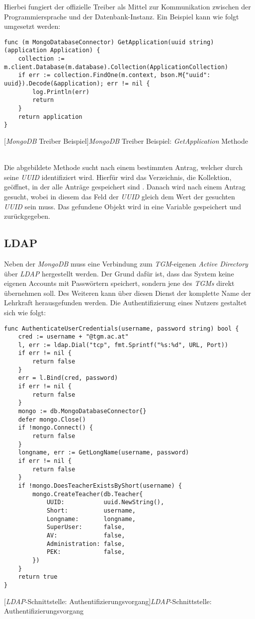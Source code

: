 \newpage

Hierbei fungiert der offizielle Treiber als Mittel zur Kommunikation zwischen der Programmiersprache und der Datenbank-Instanz. Ein Beispiel kann wie folgt umgesetzt werden:

\begin{verbatim}
func (m MongoDatabaseConnector) GetApplication(uuid string) (application Application) {
	collection := m.client.Database(m.database).Collection(ApplicationCollection)
	if err := collection.FindOne(m.context, bson.M{"uuid": uuid}).Decode(&application); err != nil {
		log.Println(err)
		return
	}
	return application
}
\end{verbatim}
[\textit{MongoDB} Treiber Beispiel]{\textit{MongoDB} Treiber Beispiel: \textit{GetApplication} Methode}

~\\

Die abgebildete Methode sucht nach einem bestimmten Antrag, welcher durch seine \textit{UUID} identifiziert wird. Hierfür wird das Verzeichnis, die Kollektion, geöffnet, in der alle Anträge gespeichert sind \cite{mongogo}. Danach wird nach einem Antrag gesucht, wobei in diesem das Feld der \textit{UUID} gleich dem Wert der gesuchten \textit{UUID} sein muss. Das gefundene Objekt wird in eine Variable gespeichert und zurückgegeben.

\newpage

\subsection{LDAP}

Neben der \textit{MongoDB} muss eine Verbindung zum \textit{TGM}-eigenen \textit{Active Directory} über \textit{LDAP} hergestellt werden. Der Grund dafür  ist, dass das System keine eigenen Accounts mit Passwörtern speichert, sondern jene des \textit{TGMs} direkt übernehmen soll. Des Weiteren kann über diesen Dienst der komplette Name der Lehrkraft herausgefunden werden. Die Authentifizierung eines Nutzers gestaltet sich wie folgt:

\begin{verbatim}
func AuthenticateUserCredentials(username, password string) bool {
	cred := username + "@tgm.ac.at"
	l, err := ldap.Dial("tcp", fmt.Sprintf("%s:%d", URL, Port))
	if err != nil {
		return false
	}
	err = l.Bind(cred, password)
	if err != nil {
		return false
	}
	mongo := db.MongoDatabaseConnector{}
	defer mongo.Close()
	if !mongo.Connect() {
		return false
	}
	longname, err := GetLongName(username, password)
	if err != nil {
		return false
	}
	if !mongo.DoesTeacherExistsByShort(username) {
		mongo.CreateTeacher(db.Teacher{
			UUID:           uuid.NewString(),
			Short:          username,
			Longname:       longname,
			SuperUser:      false,
			AV:             false,
			Administration: false,
			PEK:            false,
		})
	}
	return true
}
\end{verbatim}
[\textit{LDAP}-Schnittstelle: Authentifizierungsvorgang]{\textit{LDAP}-Schnittstelle: Authentifizierungsvorgang \cite{go-ldap}}


